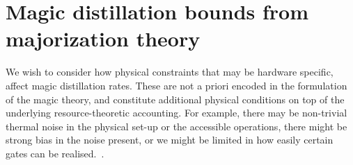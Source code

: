 \documentclass[pra,
aps,
twocolumn,
superscriptaddress,
groupedaddress,
nofootinbib,
reprint
]{revtex4-1}
\begin{document}
\section{Magic distillation bounds from majorization theory}
\label{sec:frag}

We wish to consider how physical constraints that may be hardware specific, affect magic distillation rates. These are not a priori encoded in the formulation of the magic theory, and constitute additional physical conditions on top of the underlying resource-theoretic accounting. For example, there may be non-trivial thermal noise in the physical set-up or the accessible operations, there might be strong bias in the noise present, or we might be limited in how easily certain gates can be realised.~\cite{Aliferis_2008, Stephens_2013, Li_2015, Babbush_2018, Tuckett_2019, Guillaud_2019, Fowler_2019}. 
\end{document}
